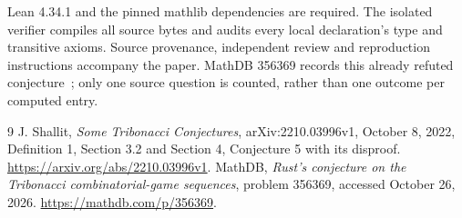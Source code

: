 \documentclass[11pt]{article}
\begin{document}
Lean 4.34.1 and the pinned mathlib dependencies are required. The isolated
verifier compiles all source bytes and audits every local declaration's
type and transitive axioms. Source provenance, independent review and
reproduction instructions accompany the paper. MathDB 356369 records
this already refuted conjecture~\cite{MathDB}; only one source question
is counted, rather than one outcome per computed entry.
\begin{thebibliography}{9}
 J. Shallit, \emph{Some Tribonacci Conjectures},
arXiv:2210.03996v1, October 8, 2022, Definition 1, Section 3.2 and
Section 4, Conjecture 5 with its disproof.
\url{https://arxiv.org/abs/2210.03996v1}.
 MathDB, \emph{Rust's conjecture on the Tribonacci
combinatorial-game sequences}, problem 356369, accessed October 26, 2026.
\url{https://mathdb.com/p/356369}.
\end{thebibliography}
\end{document}
